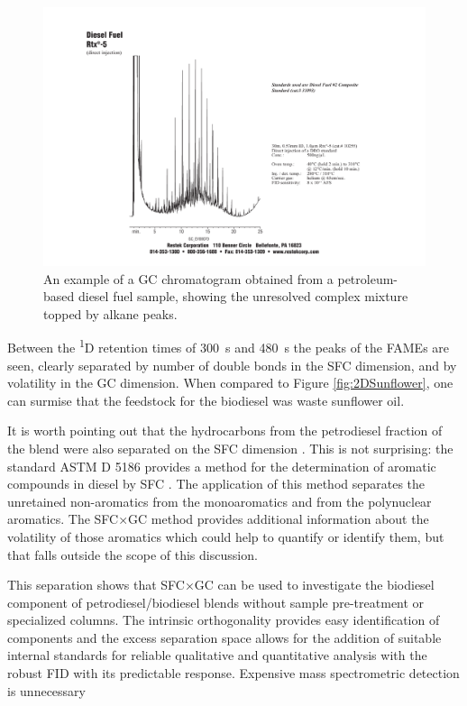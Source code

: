 \begin{figure}
	\centering
	\includegraphics[width=\textwidth]{Figures/hchump.pdf}
	\decoRule	
	
\caption[An example of a petrochemical fuel chromatogram.]{An example of a GC
chromatogram obtained from a petroleum-based diesel fuel sample, showing the
unresolved complex mixture topped by alkane peaks.}
	
	\label{fig:HCHump} 
\end{figure}

Between the \textsuperscript{1}D retention times of \SI{300}{\second} and
\SI{480}{\second} the peaks of the FAMEs are seen, clearly separated by number
of double bonds in the SFC dimension, and by volatility in the GC dimension.
When compared to Figure \ref{fig:2DSunflower}, one can surmise that the
feedstock for the biodiesel was waste sunflower oil.

It is worth pointing out that the hydrocarbons from the petrodiesel fraction of
the blend were also separated on the SFC dimension \autocite{Venter1999a}. This
is not surprising: the standard ASTM D 5186 provides a method for the
determination of aromatic compounds in diesel by SFC \autocite{ASTMD5186}. The
application of this method separates the unretained non-aromatics from the
monoaromatics and from the polynuclear aromatics. The SFC×GC method provides
additional information about the volatility of those aromatics which could help
to quantify or identify them, but that falls outside the scope of this
discussion.

This separation shows that SFC×GC can be used to investigate the biodiesel
component of petrodiesel/biodiesel blends without sample pre-treatment or
specialized columns. The intrinsic orthogonality provides easy identification of
components and the excess separation space allows for the addition of suitable
internal standards for reliable qualitative and quantitative analysis with the
robust FID with its predictable response. Expensive
mass spectrometric detection is unnecessary

